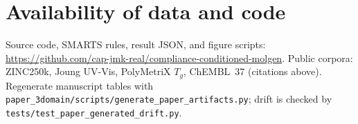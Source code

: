\documentclass[12pt]{article}
\begin{document}
\section*{Availability of data and code}

Source code, SMARTS rules, result JSON, and figure scripts:
\url{https://github.com/cap-jmk-real/compliance-conditioned-molgen}.
Public corpora: ZINC250k, Joung UV-Vis, PolyMetriX $T_g$, ChEMBL~37 (citations above).
Regenerate manuscript tables with
\texttt{paper\_3domain/scripts/generate\_paper\_artifacts.py}; drift is checked by
\texttt{tests/test\_paper\_generated\_drift.py}.

\printbibliography[heading=bibintoc,title={References}]
\end{document}
